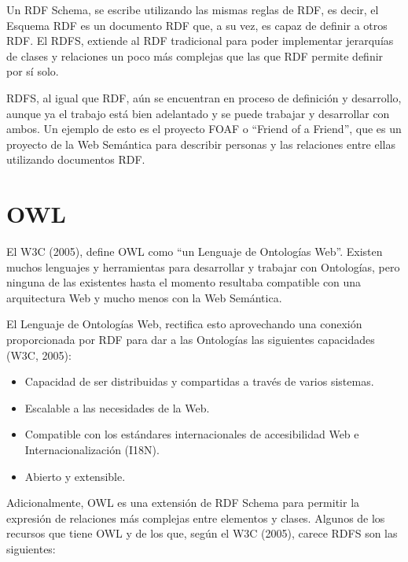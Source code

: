 Un RDF Schema, se escribe utilizando las mismas reglas de RDF, es decir, el Esquema RDF es un documento RDF que, a su vez, es capaz de definir a otros RDF. El RDFS, extiende al RDF tradicional para poder implementar jerarquías de clases y relaciones un poco más complejas que las que RDF permite definir por sí solo.

RDFS, al igual que RDF, aún se encuentran en proceso de definición y desarrollo, aunque ya el trabajo está bien adelantado y se puede trabajar y desarrollar con ambos. Un ejemplo de esto es el proyecto FOAF o ``Friend of a Friend'', que es un proyecto de la Web Semántica para describir personas y las relaciones entre ellas utilizando documentos RDF.

\section{OWL}

El W3C (2005), define OWL como ``un Lenguaje de Ontologías Web''. Existen muchos lenguajes y herramientas para desarrollar y trabajar con Ontologías, pero ninguna de las existentes hasta el momento resultaba compatible con una arquitectura Web y mucho menos con la Web Semántica. 

El Lenguaje de Ontologías Web, rectifica esto aprovechando una conexión proporcionada por RDF para dar a las Ontologías las siguientes capacidades (W3C, 2005):

\begin{itemize}
\item Capacidad de ser distribuidas y compartidas a través de varios sistemas.
\item Escalable a las necesidades de la Web.
\item Compatible con los estándares internacionales de accesibilidad Web e Internacionalización (I18N).
\item Abierto y extensible.
\end{itemize}

Adicionalmente, OWL es una extensión de RDF Schema para permitir la expresión de relaciones más complejas entre elementos y clases. Algunos de los recursos que tiene OWL y de los que, según el W3C (2005), carece RDFS son las siguientes:

